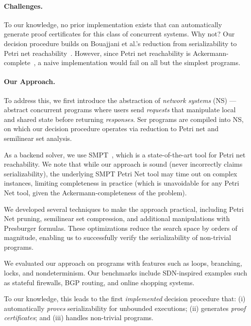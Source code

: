 \paragraph{Challenges.}
To our knowledge, no prior implementation exists that can automatically generate proof certificates for this class of concurrent systems.
Why not?
Our decision procedure builds on Bouajjani et al.'s reduction from serializability to Petri net reachability~\cite{BoEmEnHa13}. However, since Petri net reachability is Ackermann-complete~\cite{CzWo22}, a naive implementation would fail on all but the simplest programs. 
\vspace{-.5em}
\paragraph{Our Approach.}
To address this, we first introduce the abstraction of \textit{network systems} (NS) --- abstract concurrent programs where users send \textit{requests} that manipulate local and shared state before returning \textit{responses}. Ser programs are compiled into NS, on which our decision procedure operates via reduction to Petri net and semilinear set analysis.

As a backend solver, we use SMPT~\cite{AmDa23}, which is a state-of-the-art tool for Petri net reachability.
We note that while our approach is sound (never incorrectly claims serializability), the underlying SMPT Petri Net tool may time out on complex instances, limiting completeness in practice (which is unavoidable for any Petri Net tool, given the Ackermann-completeness of the problem).

We developed several techniques to make the approach practical, including Petri Net pruning, semilinear set compression, and additional manipulations with Presburger formulas.
These optimizations reduce the search space by orders of magnitude, enabling us to successfully verify the serializability of non-trivial programs.

We evaluated our approach on programs with features such as loops, branching, locks, and nondeterminism. Our benchmarks include SDN-inspired examples such as stateful firewalls, BGP routing, and online shopping systems.

To our knowledge, this leads to the first \emph{implemented} decision procedure that: (i) automatically \textit{proves} serializability for unbounded executions; (ii) generates \textit{proof certificates}; and (iii) handles non-trivial programs.


